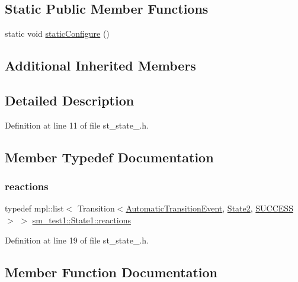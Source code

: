 \subsection*{Static Public Member Functions}
\begin{DoxyCompactItemize}
\item 
static void \hyperlink{structsm__test1_1_1State1_a4592ba30f35ec71dd3f36eb80a7c87ea}{static\+Configure} ()
\end{DoxyCompactItemize}
\subsection*{Additional Inherited Members}


\subsection{Detailed Description}


Definition at line 11 of file st\+\_\+state\+\_.\+h.



\subsection{Member Typedef Documentation}
\mbox{\label{structsm__test1_1_1State1_acbfcf212fdd6d8896d2f1d40e41c63b2}} 
\subsubsection{\texorpdfstring{reactions}{reactions}}
{\footnotesize\ttfamily typedef mpl\+::list$<$ Transition$<$\hyperlink{structsm__test1_1_1AutomaticTransitionEvent}{Automatic\+Transition\+Event}, \hyperlink{structsm__test1_1_1State2}{State2}, \hyperlink{classSUCCESS}{S\+U\+C\+C\+E\+SS}$>$ $>$ \hyperlink{structsm__test1_1_1State1_acbfcf212fdd6d8896d2f1d40e41c63b2}{sm\+\_\+test1\+::\+State1\+::reactions}}



Definition at line 19 of file st\+\_\+state\+\_.\+h.



\subsection{Member Function Documentation}
\mbox{\label{structsm__test1_1_1State1_ae5d21dd2726e2433a2251cd81c7ec20e}} 
